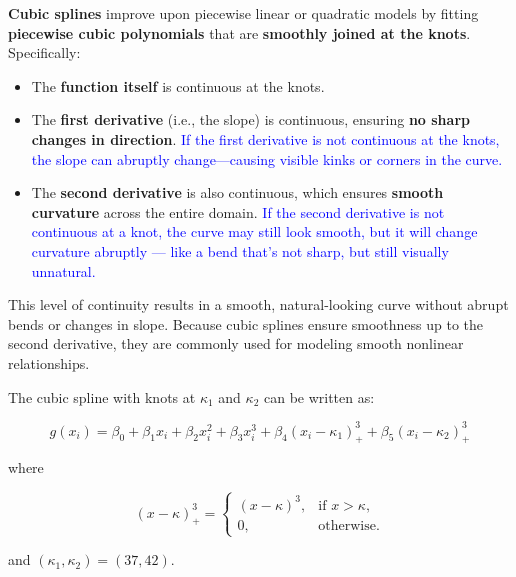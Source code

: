 \documentclass[
  letterpaper,
  DIV=11,
  numbers=noendperiod]{scrreprt}
\providecommand{\tightlist}{%
  \setlength{\itemsep}{0pt}\setlength{\parskip}{0pt}}\usepackage{longtable,booktabs,array}
\begin{document}
\textbf{Cubic splines} improve upon piecewise linear or quadratic models
by fitting \textbf{piecewise cubic polynomials} that are
\textbf{smoothly joined at the knots}. Specifically:

\begin{itemize}
\tightlist
\item
  The \textbf{function itself} is continuous at the knots.\\
\item
  The \textbf{first derivative} (i.e., the slope) is continuous,
  ensuring \textbf{no sharp changes in direction}.
  \textcolor{blue}{If the first derivative is not continuous at the knots, the slope can abruptly change—causing visible kinks or corners in the curve.}
\item
  The \textbf{second derivative} is also continuous, which ensures
  \textbf{smooth curvature} across the entire domain.
  \textcolor{blue}{If the second derivative is not continuous at a knot, the curve may still look smooth, but it will change curvature abruptly — like a bend that's not sharp, but still visually unnatural.}
\end{itemize}

This level of continuity results in a smooth, natural-looking curve
without abrupt bends or changes in slope. Because cubic splines ensure
smoothness up to the second derivative, they are commonly used for
modeling smooth nonlinear relationships.

The cubic spline with knots at \(\kappa_1\) and \(\kappa_2\) can be
written as:

\[
g(x_i) = \beta_0 + \beta_1 x_i + \beta_2 x_i^2 + \beta_3 x_i^3 + \beta_4 (x_i - \kappa_1)_+^3 + \beta_5 (x_i - \kappa_2)_+^3
\]

where

\[(x - \kappa)_+^3 =
\begin{cases}
  (x - \kappa)^3, & \text{if } x > \kappa, \\
  0, & \text{otherwise.}
\end{cases}\]

and \((\kappa_1, \kappa_2) = (37, 42)\).
\end{document}
